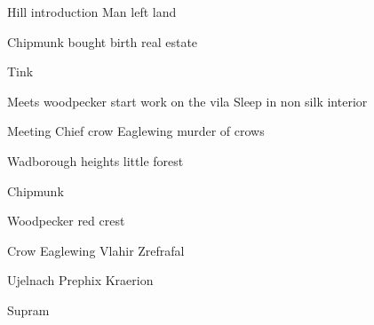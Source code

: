 \documentclass[smalldemyvopaper,11pt,twoside,onecolumn,openright,extrafontsizes]{memoir}
\begin{document}
\newpage
 Hill introduction Man left land

 Chipmunk bought birth real estate
 
 Tink

 Meets woodpecker start work on the vila
 Sleep in non silk interior

Meeting Chief crow Eaglewing murder of crows

Wadborough heights little forest 

Chipmunk 

Woodpecker 
red crest

Crow Eaglewing
Vlahir
Zrefrafal

Ujelnach
Prephix
Kraerion

Supram

\end{document}
